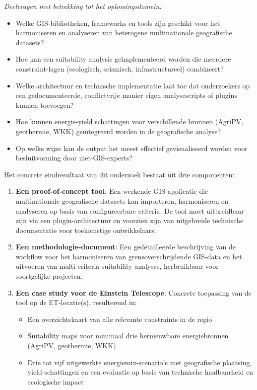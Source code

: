 \textit{Deelvragen met betrekking tot het oplossingsdomein:}
\begin{itemize}
    \item Welke GIS-\-bibliotheken, frameworks en tools zijn geschikt voor het harmoniseren en analyseren van heterogene multinationale geografische datasets?
    \item Hoe kan een suitability analysis geïmplementeerd worden die meerdere constraint-\-lagen (ecologisch, seismisch, infrastructureel) combineert?
    \item Welke architectuur en technische implementatie laat toe dat onderzoekers op een gedocumenteerde, conflictvrije manier eigen analysescripts of plugins kunnen toevoegen?
    \item Hoe kunnen energie-\-yield schattingen voor verschillende bronnen (AgriPV, geothermie, WKK) geïntegreerd worden in de geografische analyse?
    \item Op welke wijze kan de output het meest effectief gevisualiseerd worden voor besluitvorming door niet-\-GIS-\-experts?
\end{itemize}

Het concrete eindresultaat van dit onderzoek bestaat uit drie componenten:

\begin{enumerate}
    \item \textbf{Een proof-\-of-\-concept tool}: Een werkende GIS-\-applicatie die multinationale geografische datasets kan importeren, harmoniseren en analyseren op basis van configureerbare criteria. De tool moet uitbreidbaar zijn via een plugin-\-architectuur en voorzien zijn van uitgebreide technische documentatie voor toekomstige ontwikkelaars.
    
    \item \textbf{Een methodologie-\-document}: Een gedetailleerde beschrijving van de workflow voor het harmoniseren van grensoverschrijdende GIS-\-data en het uitvoeren van multi-\-criteria suitability analyses, herbruikbaar voor soortgelijke projecten.
    
    \item \textbf{Een case study voor de Einstein Telescope}: Concrete toepassing van de tool op de ET-\-locatie(s), resulterend in:
    \begin{itemize}
        \item Een overzichtskaart van alle relevante constraints in de regio
        \item Suitability maps voor minimaal drie hernieuwbare energiebronnen (AgriPV, geothermie, WKK)
        \item Drie tot vijf uitgewerkte energiemix-\-scenario's met geografische plaatsing, yield-\-schattingen en een evaluatie op basis van technische haalbaarheid en ecologische impact
    \end{itemize}
\end{enumerate}

